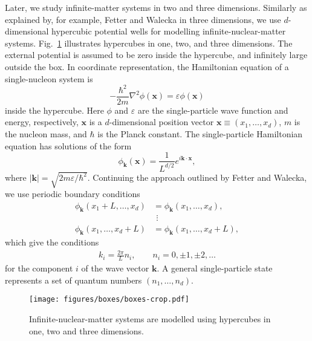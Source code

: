 \documentclass[a4paper,12pt]{report}
\begin{document}
Later, we study infinite-matter systems in two and three dimensions. Similarly as explained by, for example, Fetter and Walecka \cite{fetter} in three dimensions, we use $d$-dimensional hypercubic potential wells for modelling infinite-nuclear-matter systems. Fig.~\ref{fig:boxes} illustrates hypercubes in one, two, and three dimensions. The external potential is assumed to be zero inside the hypercube, and infinitely large outside the box. In coordinate representation, the Hamiltonian equation of a single-nucleon system is  
\begin{equation}
  -\frac{\hbar^{2}}{2m}\nabla^{2}\phi(\mathbf{x}) = \varepsilon\phi(\mathbf{x})
\end{equation}
inside the hypercube. Here $\phi $ and $\varepsilon $ are the single-particle wave function and energy, respectively, $\mathbf{x}$ is a $d$-dimensional position vector $\mathbf{x} \equiv (x_{1}, \dots, x_{d})$, $m$ is the nucleon mass, and $\hbar $ is the Planck constant. The single-particle Hamiltonian equation has solutions of the form
\begin{equation} \label{eq:planeWave}
\phi_{\mathbf{k}}(\mathbf{x}) = \frac{1}{L^{d/2}}e^{i\mathbf{k}\cdot \mathbf{x}},
\end{equation}
where $|\mathbf{k}| = \sqrt{2m\varepsilon /\hbar^{2}}$. Continuing the approach outlined by Fetter and Walecka, we use periodic boundary conditions 
\begin{align}
  \phi_{\mathbf{k}}(x_{1}+L, \dots , x_{d}) &= \phi_{\mathbf{k}}(x_{1}, \dots , x_{d}), \nonumber \\
  &\ \, \vdots \nonumber \\
  \phi_{\mathbf{k}}(x_{1}, \dots , x_{d}+L) &= \phi_{\mathbf{k}}(x_{1}, \dots , x_{d}+L),
\end{align} 
which give the conditions
\begin{align}
  k_{i} = \frac{2\pi }{L}n_{i}, \qquad n_{i} = 0, \pm 1, \pm 2, \dots
  \label{eq:mom_sp_discr}
\end{align}
for the component $i$ of the wave vector $\mathbf{k}$. A general single-particle state represents a set of quantum numbers $(n_{1}, \dots , n_{d})$.\cite{fetter, harris, liboff}  

\begin{figure} 
  \centering
  \texttt{[image: figures/boxes/boxes-crop.pdf]}
  \caption{Infinite-nuclear-matter systems are modelled using hypercubes in one, two and three dimensions.}
  \label{fig:boxes}
\end{figure}
\end{document}
